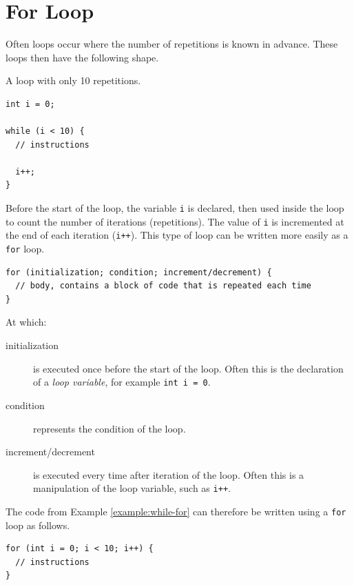 \documentclass[11pt,fleqn]{book} %
\begin{document}
\section{For Loop}
Often loops occur where the number of repetitions is known in advance. These loops then have the following shape.

\begin{example}
	\label{example:while-for}
	\phantom{ }
    A loop with only 10 repetitions.
	\begin{verbatim}
int i = 0;

while (i < 10) {
  // instructions

  i++;
}
	\end{verbatim}
\end{example}

\noindent
Before the start of the loop, the variable \texttt{i} is declared, then used inside the loop to count the number of iterations (repetitions). The value of \texttt{i} is incremented at the end of each iteration (\texttt{i++}). This type of loop can be written more easily as a \texttt{for} loop.

\begin{definition}[For]
	\phantom{ }
	\begin{verbatim}
for (initialization; condition; increment/decrement) {
  // body, contains a block of code that is repeated each time
}
	\end{verbatim}
	At which:
	\begin{description}
        \item[initialization] is executed once before the start of the loop. Often this is the declaration of a \emph{loop variable}, for example \texttt{int i = 0}.
		\item[condition] represents the condition of the loop.
		\item[increment/decrement] is executed every time after iteration of the loop. Often this is a manipulation of the loop variable, such as \texttt{i++}.
	\end{description}
\end{definition}
\noindent
The code from Example \ref{example:while-for} can therefore be written using a \texttt{for} loop as follows.

\begin{example}
	\phantom{ }
	\begin{verbatim}
for (int i = 0; i < 10; i++) {
  // instructions
}
	\end{verbatim}
\end{example}
\end{document}
